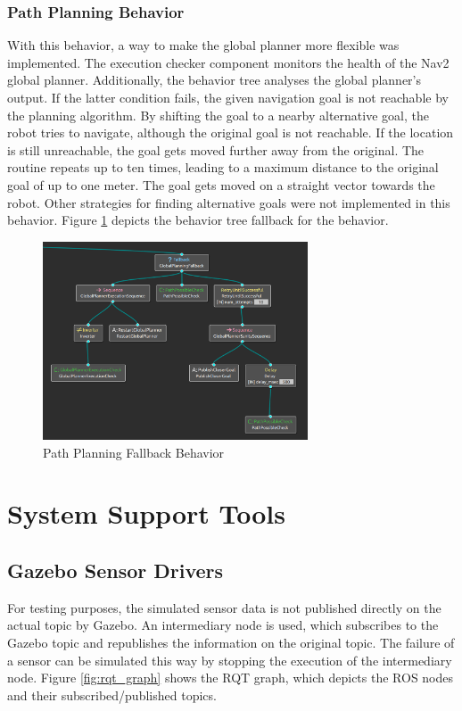 \subsubsection{Path Planning Behavior}

With this behavior, a way to make the global planner more flexible was implemented. 
The execution checker component monitors the health of the Nav2 global planner. Additionally, the behavior tree analyses the global planner's output. If the latter condition fails, the given navigation goal is not reachable by the planning algorithm. By shifting the goal to a nearby alternative goal, the robot tries to navigate, although the original goal is not reachable. If the location is still unreachable, the goal gets moved further away from the original. The routine repeats up to ten times, leading to a maximum distance to the original goal of up to one meter. 
The goal gets moved on a straight vector towards the robot. Other strategies for finding alternative goals were not implemented in this behavior. Figure \ref{fig:global_planning_fallback} depicts the behavior tree fallback for the behavior.

\begin{center}
	\begin{figure}[ht]
	\includegraphics[width=0.7\textwidth]{images/global_planning_fallback.png}
	\caption{Path Planning Fallback Behavior}
	\label{fig:global_planning_fallback}
	\end{figure}
\end{center}

\section{System Support Tools}
\subsection{Gazebo Sensor Drivers}
For testing purposes, the simulated sensor data is not published directly on the actual topic by Gazebo. An intermediary node is used, which subscribes to the Gazebo topic and republishes the information on the original topic. The failure of a sensor can be simulated this way by stopping the execution of the intermediary node. Figure \ref{fig:rqt_graph} shows the RQT graph, which depicts the ROS nodes and their subscribed/published topics. 

